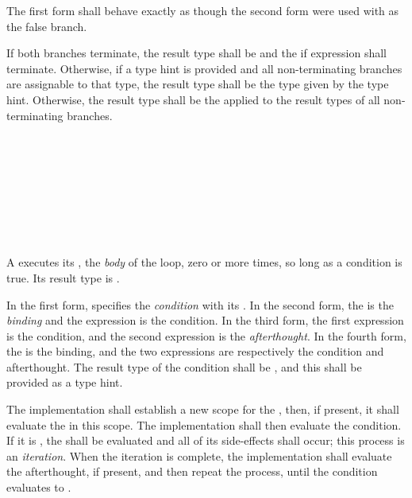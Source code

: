 \specsubsubitem
The first form shall behave exactly as though the second form were used with
 as the false branch.

\specsubsubitem
If both branches terminate, the result type shall be  and the if
expression shall terminate. Otherwise, if a type hint is provided and all
non-terminating branches are assignable to that type, the result type shall be
the type given by the type hint. Otherwise, the result type shall be the
 applied to the result types of all
non-terminating branches.


\begin{grammar}
 \\
	 \terminal{(}  \terminal{)}  \\

 \\
	 \\
	 \terminal{;}  \\
	 \terminal{;}  \\
	 \terminal{;}  \terminal{;}  \\
\end{grammar}

\specsubsubitem
A  executes its , the
\textit{body} of the loop, zero or more times, so long as a condition is true.
Its result type is .

\specsubsubitem
In the first form,  specifies the \textit{condition}
with its . In the second form, the
 is the \textit{binding} and the expression is the
condition. In the third form, the first expression is the condition, and the
second expression is the \textit{afterthought}. In the fourth form, the
 is the binding, and the two expressions are
respectively the condition and afterthought. The result type of the condition
shall be , and this shall be provided as a type hint.

\specsubsubitem
The implementation shall establish a new scope for the
, then, if present, it shall evaluate the
 in this scope. The implementation shall then evaluate the
condition. If it is , the  shall be
evaluated and all of its side-effects shall occur; this process is an
\textit{iteration}. When the iteration is complete, the implementation shall
evaluate the afterthought, if present, and then repeat the process, until the
condition evaluates to .

